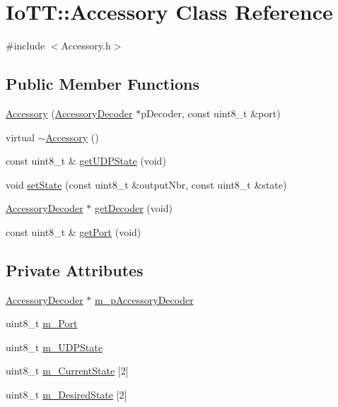 \hypertarget{classIoTT_1_1Accessory}{}\section{Io\+TT\+:\+:Accessory Class Reference}
\label{classIoTT_1_1Accessory}


{\ttfamily \#include $<$Accessory.\+h$>$}

\subsection*{Public Member Functions}
\begin{DoxyCompactItemize}
\item 
\hyperlink{classIoTT_1_1Accessory_aefd81736066539e16ea114b90020ea92}{Accessory} (\hyperlink{classIoTT_1_1AccessoryDecoder}{Accessory\+Decoder} $\ast$p\+Decoder, const uint8\+\_\+t \&port)
\item 
virtual \hyperlink{classIoTT_1_1Accessory_a1989c3805fc95d60293ae5d4dc394e64}{$\sim$\+Accessory} ()
\item 
const uint8\+\_\+t \& \hyperlink{classIoTT_1_1Accessory_a3ef90b54e0595552ffd0928c7f85cba8}{get\+U\+D\+P\+State} (void)
\item 
void \hyperlink{classIoTT_1_1Accessory_a679169c0258c5d520c86628b5141bbf3}{set\+State} (const uint8\+\_\+t \&output\+Nbr, const uint8\+\_\+t \&state)
\item 
\hyperlink{classIoTT_1_1AccessoryDecoder}{Accessory\+Decoder} $\ast$ \hyperlink{classIoTT_1_1Accessory_a46d2bbcbea444a0b55aa3bfeb51972c7}{get\+Decoder} (void)
\item 
const uint8\+\_\+t \& \hyperlink{classIoTT_1_1Accessory_ac96898811a392db73962bd16e8761ab7}{get\+Port} (void)
\end{DoxyCompactItemize}
\subsection*{Private Attributes}
\begin{DoxyCompactItemize}
\item 
\hyperlink{classIoTT_1_1AccessoryDecoder}{Accessory\+Decoder} $\ast$ \hyperlink{classIoTT_1_1Accessory_aecc352ca5802ad5b6bd3c674ebbd56d5}{m\+\_\+p\+Accessory\+Decoder}
\item 
uint8\+\_\+t \hyperlink{classIoTT_1_1Accessory_a53d57ddd9ccca253e97bdc7de4dc7d8c}{m\+\_\+\+Port}
\item 
uint8\+\_\+t \hyperlink{classIoTT_1_1Accessory_a4a41a6a76373ba2e8bcb082a1986175e}{m\+\_\+\+U\+D\+P\+State}
\item 
uint8\+\_\+t \hyperlink{classIoTT_1_1Accessory_a91f05698253837012326f3500ef27ca0}{m\+\_\+\+Current\+State} \mbox{[}2\mbox{]}
\item 
uint8\+\_\+t \hyperlink{classIoTT_1_1Accessory_ac6ab600b1fe47f6b9fca11fe8a05025c}{m\+\_\+\+Desired\+State} \mbox{[}2\mbox{]}
\end{DoxyCompactItemize}


